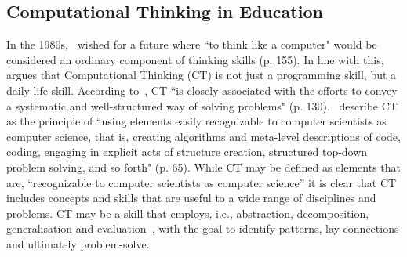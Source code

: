 \documentclass[manuscript,screen,review]{acmart}
\begin{document}
\subsection{Computational Thinking in Education}
In the 1980s,~\citet{papert1980mindstorms} wished for a future where ``to think like a computer" would be considered an ordinary component of thinking skills (p. 155). In line with this,~\citet{wing2006computationalthinking} argues that Computational Thinking (CT) is not just a programming skill, but a daily life skill. According to~\citet{otero2020computational}, CT ``is closely associated with the efforts to convey a systematic and well-structured way of solving problems" (p. 130).~\citet{tatar2017protoCT} describe CT as the principle of ``using elements easily recognizable to computer scientists as computer science, that is, creating algorithms and meta-level descriptions of code, coding, engaging in explicit acts of structure creation, structured top-down problem solving, and so forth" (p. 65). While CT may be defined as elements that are, ``recognizable to computer scientists as computer science'' it is clear that CT includes concepts and  skills that are useful to a wide range of disciplines and problems. CT may be a skill that employs, i.e., abstraction, decomposition, generalisation and evaluation~\cite{selby2013computational}, with the goal to identify patterns, lay connections and ultimately problem-solve. 




\end{document}
